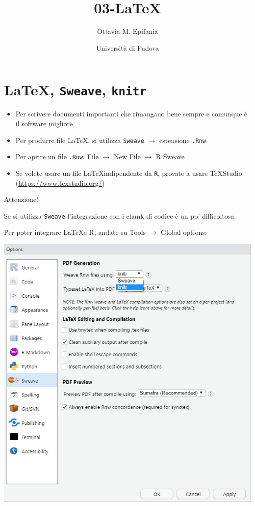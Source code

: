 \documentclass[aspectratio=149]{beamer} %
\begin{document}


\title{03-\LaTeX}
\author{Ottavia M. Epifania}
\date{Università di Padova}

\begin{frame}
\maketitle
\end{frame}

\section{\LaTeX, \texttt{Sweave}, \texttt{knitr}}

\begin{frame}

\begin{itemize}
\item Per scrivere documenti importanti che rimangano bene sempre e comunque è il software migliore

\item Per produrre file LaTeX, si utilizza \texttt{Sweave} $\rightarrow$ estensione \texttt{.Rnw}

\item Per aprire un file  \texttt{.Rnw}: File $\rightarrow$ New File $\rightarrow$ R Sweave 

\item Se volete usare un file \LaTeX indipendente da \texttt{R}, provate a usare TeXStudio (\url{https://www.texstudio.org/})
\end{itemize}


\end{frame}


\begin{frame}{Attenzione!}
 
 Se si utilizza \texttt{Sweave} l'integrazione con i chunk di codice è un po' difficoltosa.

Per  poter integrare \LaTeX e R, andate su Tools $\rightarrow$ Global options: 

\centering
\includegraphics[width=.60\linewidth]{img/knitr.png}

\end{frame}
\end{document}
